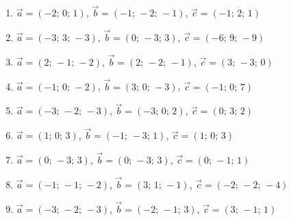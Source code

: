 \begin{enumerate}[label=\arabic*., leftmargin=*]
\item $\vec a=(-2;\,0;\,1)$, $\vec b=(-1;\,-2;\,-1)$, $\vec c=(-1;\,2;\,1)$
\item $\vec a=(-3;\,3;\,-3)$, $\vec b=(0;\,-3;\,3)$, $\vec c=(-6;\,9;\,-9)$
\item $\vec a=(2;\,-1;\,-2)$, $\vec b=(2;\,-2;\,-1)$, $\vec c=(3;\,-3;\,0)$
\item $\vec a=(-1;\,0;\,-2)$, $\vec b=(3;\,0;\,-3)$, $\vec c=(-1;\,0;\,7)$
\item $\vec a=(-3;\,-2;\,-3)$, $\vec b=(-3;\,0;\,2)$, $\vec c=(0;\,3;\,2)$
\item $\vec a=(1;\,0;\,3)$, $\vec b=(-1;\,-3;\,1)$, $\vec c=(1;\,0;\,3)$
\item $\vec a=(0;\,-3;\,3)$, $\vec b=(0;\,-3;\,3)$, $\vec c=(0;\,-1;\,1)$
\item $\vec a=(-1;\,-1;\,-2)$, $\vec b=(3;\,1;\,-1)$, $\vec c=(-2;\,-2;\,-4)$
\item $\vec a=(-3;\,-2;\,-3)$, $\vec b=(-2;\,-1;\,3)$, $\vec c=(3;\,-1;\,1)$
\end{enumerate}

